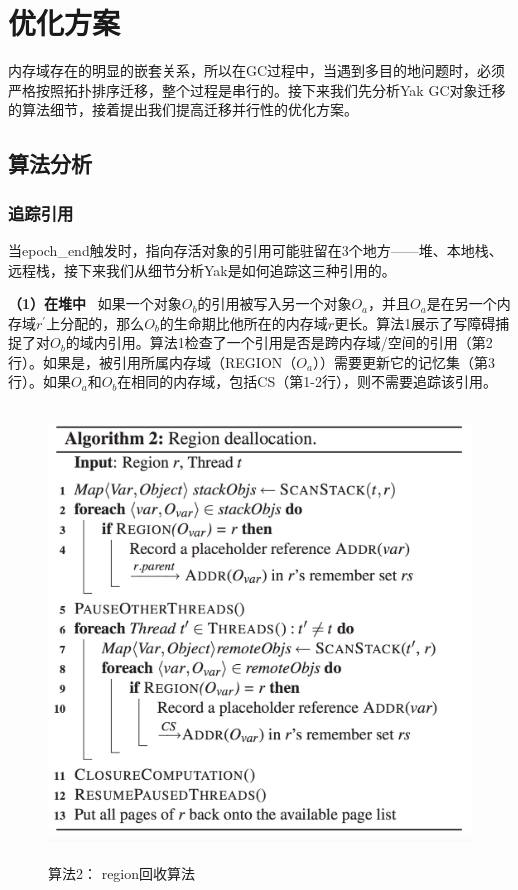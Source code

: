 
\chapter{优化方案}
内存域存在的明显的嵌套关系，所以在GC过程中，当遇到多目的地问题时，必须严格按照拓扑排序迁移，整个过程是串行的。接下来我们先分析Yak GC对象迁移的算法细节，接着提出我们提高迁移并行性的优化方案。

\section{算法分析}
\subsection{追踪引用}
当epoch\_end触发时，指向存活对象的引用可能驻留在3个地方——堆、本地栈、远程栈，接下来我们从细节分析Yak是如何追踪这三种引用的。

\textbf{（1）在堆中}  \ 如果一个对象$O_b$的引用被写入另一个对象$O_a$，并且$O_a$是在另一个内存域$r^{'}$上分配的，那么$O_b$的生命期比他所在的内存域$r$更长。算法1展示了写障碍捕捉了对$O_b$的域内引用。算法1检查了一个引用是否是跨内存域/空间的引用（第2行）。如果是，被引用所属内存域（REGION（$O_a$））需要更新它的记忆集（第3行）。如果$O_a$和$O_b$在相同的内存域，包括CS（第1-2行），则不需要追踪该引用。
\begin{figure}[H]
    \centering
    \includegraphics[width=12cm,height=12cm]{figure/algorithm2.jpg}
    \caption{
        算法2： region回收算法
    }
    \label{algorithm2}
\end{figure}

